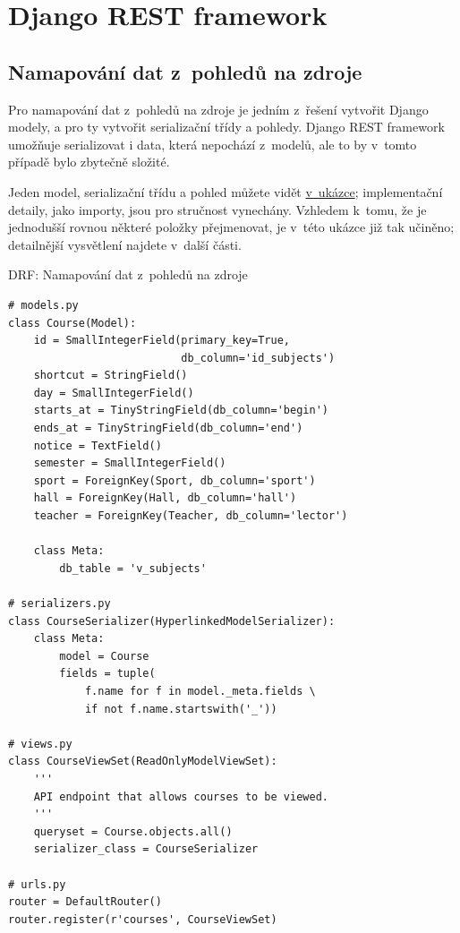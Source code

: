 \section{Django REST framework}\label{django-rest-framework}

\subsection{Namapování dat z~pohledů na zdroje}\label{namapovuxe1nuxed-dat-z-pohledux16f-na-zdroje}

Pro namapování dat z~pohledů na zdroje je jedním z~řešení vytvořit Django modely, a pro ty vytvořit serializační třídy a pohledy. Django REST framework umožňuje serializovat i data, která nepochází z~modelů, ale to by v~tomto případě bylo zbytečně složité.

Jeden model, serializační třídu a pohled můžete vidět \protect\hyperlink{code:drf:mapping}{v~ukázce}; implementační detaily, jako importy, jsou pro stručnost vynechány. Vzhledem k~tomu, že je jednodušší rovnou některé položky přejmenovat, je v~této ukázce již tak učiněno; detailnější vysvětlení najdete v~další části.

\begin{listing}[htbp]
\caption{{\label{code:drf:mapping}DRF: Namapování dat z~pohledů na zdroje}}
\begin{verbatim}
# models.py
class Course(Model):
    id = SmallIntegerField(primary_key=True,
                           db_column='id_subjects')
    shortcut = StringField()
    day = SmallIntegerField()
    starts_at = TinyStringField(db_column='begin')
    ends_at = TinyStringField(db_column='end')
    notice = TextField()
    semester = SmallIntegerField()
    sport = ForeignKey(Sport, db_column='sport')
    hall = ForeignKey(Hall, db_column='hall')
    teacher = ForeignKey(Teacher, db_column='lector')

    class Meta:
        db_table = 'v_subjects'

# serializers.py
class CourseSerializer(HyperlinkedModelSerializer):
    class Meta:
        model = Course
        fields = tuple(
            f.name for f in model._meta.fields \
            if not f.name.startswith('_'))

# views.py
class CourseViewSet(ReadOnlyModelViewSet):
    '''
    API endpoint that allows courses to be viewed.
    '''
    queryset = Course.objects.all()
    serializer_class = CourseSerializer

# urls.py
router = DefaultRouter()
router.register(r'courses', CourseViewSet)
\end{verbatim}
\end{listing}


